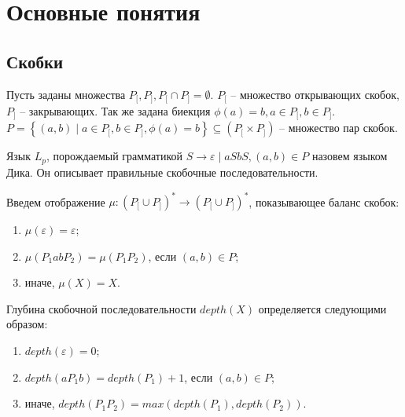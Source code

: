 \chapter{Основные понятия} \label{chapter1}
\section{Скобки}


Пусть заданы множества $P_[, P_], P_[ \cap P_] = \emptyset$. $P_[$ -- множество открывающих скобок, $P_]$ -- закрывающих.
Так же задана биекция $\phi(a) = b, a \in P_[, b \in P_]$.
$P = \left\{ (a, b) \mid a \in P_[, b \in P_], \phi(a) = b \right\} \subseteq \left( P_[ \times P_] \right)$ -- множество пар скобок.

Язык $L_p$, порождаемый грамматикой $S \rightarrow \varepsilon \mid a S b S, (a, b) \in P$ назовем языком Дика. Он описывает правильные скобочные последовательности.

Введем отображение $\mu : (P_[ \cup P_])^* \to (P_[ \cup P_])^* $, показывающее баланс скобок:
\begin{enumerate}[label=\arabic*)]
    \item $\mu(\varepsilon) = \varepsilon$;
    \item $\mu(P_1 a b P_2) = \mu(P_1 P_2)$, если $(a, b) \in P$;
    \item иначе, $\mu(X) = X$.
\end{enumerate}

Глубина скобочной последовательности $depth(X)$ определяется следующими образом:
\begin{enumerate}[label=\arabic*)]
    \item $depth(\varepsilon) = 0$;
    \item $depth(a P_1 b) = depth(P_1) + 1$, если $(a, b) \in P$;
    \item иначе, $depth(P_1 P_2) = max(depth(P_1), depth(P_2))$.
\end{enumerate}

